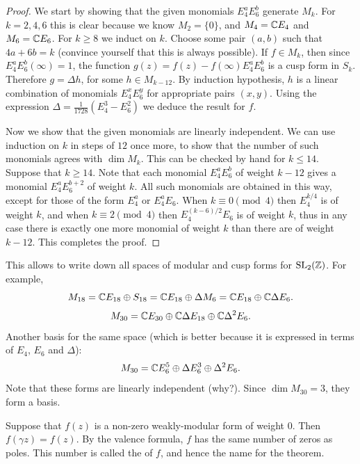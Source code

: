 \begin{proof}
  We start by showing that the given monomials $E_4^aE_6^b$ generate $M_k$. For $k=2,4,6$ this is clear because we know $M_2=\{0\}$, and $M_4=\mathbb{C} E_4$ and $M_6=\mathbb{C} E_6$. For $k\geq 8$ we induct on $k$. Choose some
 pair $(a,b)$ such that $4a+6b=k$ (convince yourself that this is always possible). If $f\in M_k$, then since $E_4^aE_6^b (\infty)=1$, the function $g(z)=f(z)-f(\infty)E_4^aE_6^b$ is a cusp form in $S_k$. Therefore $g=\Delta h$, for
some $h\in M_{k-12}$. By induction hypothesis, $h$ is a linear combination of monomials $E_4^xE_6^y$ for appropriate pairs $(x,y)$. Using the expression $\Delta=\frac{1}{1728}(E_4^3-E_6^2)$ we deduce the result for $f$.

Now we show that the given monomials are linearly independent. We can use induction on $k$ in steps of $12$ once more, to show that the number of such monomials agrees with $\dim M_k$. This can be checked by hand for $k\leq 14$. Suppose that $k\geq 14$. Note that each monomial $E_4^aE_6^b$ of weight $k-12$ gives a monomial $E_4^aE_6^{b+2}$ of weight $k$. All such monomials are obtained in this way, except for those of the form $E_4^a$ or $E_4^aE_6$. When $k\equiv 0\pmod 4$ then $E_4^{k/4}$ is of weight $k$, and when $k\equiv 2\pmod 4$ then $E_4^{(k-6)/2}E_6$ is of weight $k$, thus in any case there is exactly one more monomial of weight $k$ than there are of weight $k-12$. This completes the proof.
\end{proof}

\begin{example}
  This allows to write down all spaces of modular and cusp forms for $\operatorname{SL}_2(\mathbb{Z})$. For example,
\[
M_{18} = \mathbb{C} E_{18}\oplus S_{18} = \mathbb{C} E_{18} \oplus \Delta M_6 = \mathbb{C} E_{18}\oplus \mathbb{C}\Delta E_6.
\]
\[
M_{30} = \mathbb{C} E_{30} \oplus \mathbb{C}\Delta E_{18} \oplus \mathbb{C} \Delta^2 E_6.
\]
Another basis for the same space (which is better because it is expressed in terms of $E_4$, $E_6$ and $\Delta$):
\[
M_{30} = \mathbb{C} E_6^5\oplus \Delta E_6^3 \oplus \Delta^2 E_6.
\]
Note that these forms are linearly independent (why?). Since $\dim M_{30}=3$, they form a basis.
\end{example}

\begin{remark}
  Suppose that $f(z)$ is a non-zero weakly-modular form of weight $0$. Then $f(\gamma z)=f(z)$. By the valence formula, $f$ has the same number of zeros as poles. This number is called the  of $f$, and hence the name for the theorem.
\end{remark}

